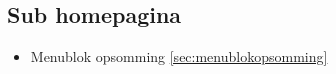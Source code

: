 \subsection{Sub homepagina}
\label{sec:subhomepagina}

\begin{itemize}
  \item Menublok opsomming \ref{sec:menublokopsomming}
\end{itemize}